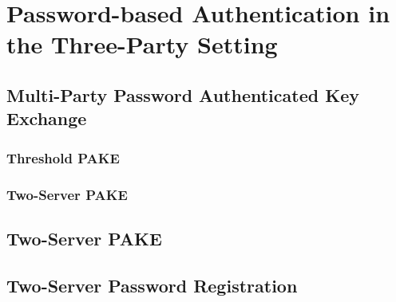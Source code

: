 \chapter{Password-based Authentication in the Three-Party Setting}

\section{Multi-Party Password Authenticated Key Exchange}

\subsection{Threshold PAKE}

\subsection{Two-Server PAKE}

\section{Two-Server PAKE}

\section{Two-Server Password Registration}
